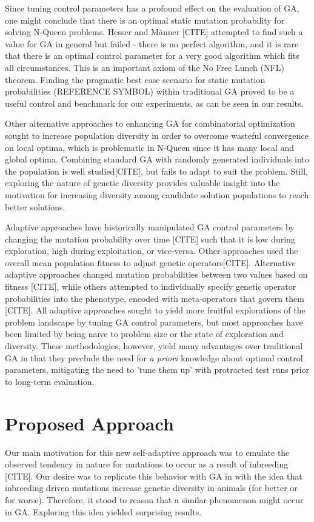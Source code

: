 \documentclass[conference]{IEEEtran}
\begin{document}
Since tuning control parameters has a profound effect on the evaluation of GA, one might conclude that there is an optimal static mutation probability for solving N-Queen problems. Hesser and M\"{a}nner [CITE] attempted to find such a value for GA in general but failed - there is no perfect algorithm, and it is rare that there is an optimal control parameter for a very good algorithm which fits all circumstances. This is an important axiom of the No Free Lunch (NFL) theorem. Finding the pragmatic best case scenario for static mutation probabilities ({REFERENCE SYMBOL}) within traditional GA proved to be a useful control and benchmark for our experiments, as can be seen in our results.

Other alternative approaches to enhancing GA for combinatorial optimization sought to increase population diversity in order to overcome wasteful convergence on local optima, which is problematic in N-Queen since it has many local and global optima. Combining standard GA with randomly generated individuals into the population is well studied[CITE], but fails to adapt to suit the problem. Still, exploring the nature of genetic diversity provides valuable insight into the motivation for increasing diversity among candidate solution populations to reach better solutions.

Adaptive approaches have historically manipulated GA control parameters by changing the mutation probability over time [CITE] such that it is low during exploration, high during exploitation, or vice-versa. Other approaches used the overall mean population fitness to adjust genetic operators[CITE]. Alternative adaptive approaches changed mutation probabilities between two values based on fitness [CITE], while others attempted to individually specify genetic operator probabilities into the phenotype, encoded with meta-operators that govern them [CITE]. All adaptive approaches sought to yield more fruitful explorations of the problem landscape by tuning GA control parameters, but most approaches have been limited by being na\"{i}ve to problem size or the state of exploration and diversity. These methodologies, however, yield many advantages over traditional GA in that they preclude the need for \textit{a priori} knowledge about optimal control parameters, mitigating the need to 'tune them up' with protracted test runs prior to long-term evaluation.

\section{Proposed Approach}\label{params}
Our main motivation for this new self-adaptive approach was to emulate the observed tendency in nature for mutations to occur as a result of inbreeding [CITE]. Our desire was to replicate this behavior with GA in with the idea that inbreeding driven mutations increase genetic diversity in animals (for better or for worse). Therefore, it stood to reason that a similar phenomenon might occur in GA. Exploring this idea yielded surprising results.
\end{document}
